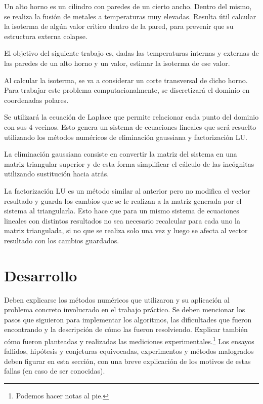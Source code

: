 \documentclass[11pt, a4paper, spanish]{article}
\begin{document}
  Un alto horno es un cilindro con paredes de un cierto ancho. Dentro del mismo, se realiza la fusión de metales a temperaturas muy elevadas. Resulta útil calcular la isoterma de algún valor critico dentro de la pared, para prevenir que su estructura externa colapse.

  El objetivo del siguiente trabajo es, dadas las temperaturas internas y externas de las paredes de un alto horno y un valor, estimar la isoterma de ese valor.

  Al calcular la isoterma, se va a considerar un corte transversal de dicho horno. Para trabajar este problema computacionalmente, se discretizará el dominio en coordenadas polares.

  Se utilizará la ecuación de Laplace que permite relacionar cada punto del dominio con sus 4 vecinos. Esto genera un sistema de ecuaciones lineales que será resuelto utilizando los métodos numéricos de eliminación gaussiana y factorización LU.

  La eliminación gaussiana consiste en convertir la matriz del sistema en una matriz triangular superior y de esta forma simplificar el cálculo de las incógnitas utilizando sustitución hacia atrás.

  La factorización LU es un método similar al anterior pero no modifica el vector resultado y guarda los cambios que se le realizan a la matriz generada por el sistema al triangularla. Esto hace que para un mismo sistema de ecuaciones lineales con distintos resultados no sea necesario recalcular para cada uno la matriz triangulada, si  no que se realiza solo una vez y luego se afecta al vector resultado con los cambios guardados.


\section{Desarrollo}

  Deben explicarse los métodos numéricos que utilizaron y su aplicación al problema concreto involucrado en el trabajo práctico. Se deben mencionar los pasos que siguieron para implementar los algoritmos, las dificultades que fueron encontrando y la descripción de cómo las fueron resolviendo. Explicar también cómo fueron planteadas y realizadas las mediciones experimentales.\footnote{Podemos hacer notas al pie.} Los ensayos fallidos, hipótesis y conjeturas equivocadas, experimentos y métodos malogrados deben figurar en esta sección, con una breve explicación de los motivos de estas fallas (en caso de ser conocidas).
\end{document}
